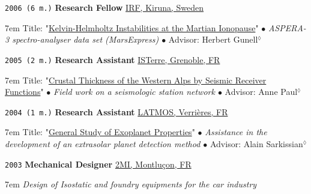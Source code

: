 \noindent \texttt{2006 (6 m.)} \tab \textbf{Research Fellow} \tab
\href{https://www2.irf.se/}{IRF, Kiruna, Sweden}
\vspace{.3em}
\begin{adjustwidth}{7em}{}
Title: "\ul{Kelvin-Helmholtz Instabilities at the Martian Ionopause}"
$\bullet$ 
\textit{ASPERA-3 spectro-analyser data set (MarsExpress) $\bullet$} Advisor: Herbert Gunell$^\lozenge$
\end{adjustwidth}
\vspace{.5em}

\noindent \texttt{2005 (2 m.)} \tab \textbf{Research Assistant} \tab
\href{https://www.isterre.fr/}{ISTerre, Grenoble, FR}
\vspace{.3em}
\begin{adjustwidth}{7em}{}
Title: "\ul{Crustal Thickness of the Western Alps by Seismic Receiver Functions}"
$\bullet$ 
\textit{Field work on a seismologic station network $\bullet$} Advisor: Anne Paul$^\lozenge$
\end{adjustwidth}
\vspace{.5em}

\noindent \texttt{2004 (1 m.)} \tab \textbf{Research Assistant} \tab
\href{https://www3.latmos.ipsl.fr/index.php/fr/accueil-latmos}{LATMOS, Verrières, FR}
\vspace{.3em}
\begin{adjustwidth}{7em}{}
Title: "\ul{General Study of Exoplanet Properties}"
$\bullet$ 
\textit{Assistance in the development of an extrasolar planet detection method $\bullet$} Advisor: Alain Sarkissian$^\lozenge$
\end{adjustwidth}
\vspace{.5em}

\noindent \texttt{2003} \tab \textbf{Mechanical Designer} \tab
\href{http://www.2migroup.eu/fr/}{2MI, Montluçon, FR}
\vspace{.3em}
\begin{adjustwidth}{7em}{}
\textit{Design of Isostatic and foundry equipments for the car industry}
\end{adjustwidth}